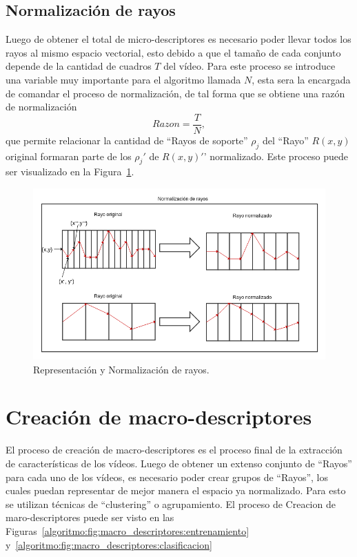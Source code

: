	\subsection{Normalización de rayos}
	\label{algoritmo:normalizacion}
	Luego de obtener el total de micro-descriptores es necesario poder llevar todos los rayos al mismo espacio vectorial, esto debido a que el tamaño de cada conjunto depende de la cantidad de cuadros $T$ del vídeo. Para este proceso se introduce una variable muy importante para el algoritmo llamada $N$, esta sera la encargada de comandar el proceso de normalización, de tal forma que se obtiene una razón de normalización
	\begin{equation}
		Razon = \frac{T}{N},
	\end{equation}
	que permite relacionar la cantidad de ``Rayos de soporte'' $\rho_j$ del ``Rayo'' $R(x,y)$ original formaran parte de los $\rho_j '$ de $R(x,y)'$' normalizado. Este proceso puede ser visualizado en la Figura~\ref{algoritmo:fig:normalizacion}.
	
	\begin{figure}[bt]
		\centering
    		\includegraphics[width=1\textwidth]{Figuras/Diagramas/normalizacion_de_rayos.png}
  		\caption{Representación y Normalización de rayos.}
  		\label{algoritmo:fig:normalizacion}
	\end{figure}	

	
\newpage	
\section{Creación de macro-descriptores}
\label{sec:macro-descriptores}
El proceso de creación de macro-descriptores es el proceso final de la extracción de características de los vídeos. Luego de obtener un extenso conjunto de ``Rayos'' para cada uno de los vídeos, es necesario poder crear grupos de ``Rayos'', los cuales puedan representar de mejor manera el espacio ya normalizado. Para esto se utilizan técnicas de ``clustering'' o agrupamiento. El proceso de Creacion de maro-descriptores puede ser visto en las Figuras~\ref{algoritmo:fig:macro_descriptores:entrenamiento} y~\ref{algoritmo:fig:macro_descriptores:clasificacion}

